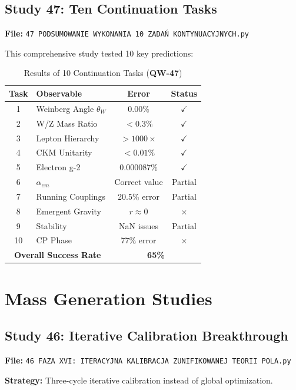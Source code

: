 \documentclass[11pt, a4paper]{article}
\theoremstyle{remark}
\newcommand{\QW}[1]{\textbf{QW-#1}}
\begin{document}
\subsection{Study 47: Ten Continuation Tasks}

\textbf{File:} \texttt{47 PODSUMOWANIE WYKONANIA 10 ZADAŃ KONTYNUACYJNYCH.py}

This comprehensive study tested 10 key predictions:

\begin{table}[H]
\centering
\caption{Results of 10 Continuation Tasks (\QW{47})}
\begin{tabular}{|c|l|c|c|}
\hline
\textbf{Task} & \textbf{Observable} & \textbf{Error} & \textbf{Status} \\
\hline
1 & Weinberg Angle $\theta_W$ & 0.00\% & $\checkmark$ \\
2 & W/Z Mass Ratio & $<0.3\%$ & $\checkmark$ \\
3 & Lepton Hierarchy & $>1000\times$ & $\checkmark$ \\
4 & CKM Unitarity & $<0.01\%$ & $\checkmark$ \\
5 & Electron g-2 & 0.000087\% & $\checkmark$ \\
6 & $\alpha_{em}$ & Correct value & Partial \\
7 & Running Couplings & 20.5\% error & Partial \\
8 & Emergent Gravity & $r \approx 0$ & $\times$ \\
9 & Stability & NaN issues & Partial \\
10 & CP Phase & 77\% error & $\times$ \\
\hline
\multicolumn{2}{|c|}{\textbf{Overall Success Rate}} & \multicolumn{2}{c|}{\textbf{65\%}} \\
\hline
\end{tabular}
\end{table}

\section{Mass Generation Studies}

\subsection{Study 46: Iterative Calibration Breakthrough}

\textbf{File:} \texttt{46 FAZA XVI: ITERACYJNA KALIBRACJA ZUNIFIKOWANEJ TEORII POLA.py}

\textbf{Strategy:} Three-cycle iterative calibration instead of global optimization.
\end{document}
